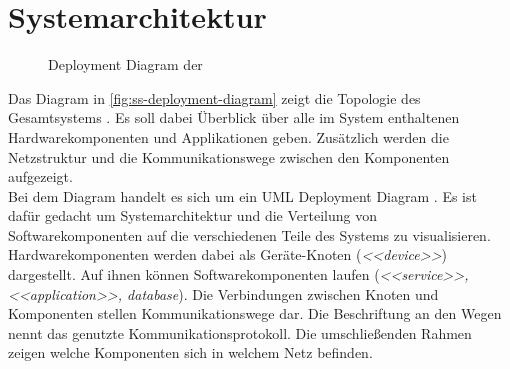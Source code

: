\chapter{Systemarchitektur}
\label{chap:systemarchitektur}

\begin{figure}
    \centering
    
    \caption{Deployment Diagram der \shst{}}
    \label{fig:ss-deployment-diagram}
\end{figure}

Das Diagram in \autoref{fig:ss-deployment-diagram} zeigt die Topologie des Gesamtsystems \shst{}.
Es soll dabei Überblick über alle im System enthaltenen Hardwarekomponenten und Applikationen
geben. Zusätzlich werden die Netzstruktur und die Kommunikationswege zwischen den Komponenten 
aufgezeigt.\\
Bei dem Diagram handelt es sich um ein UML Deployment Diagram \cite{uml-diagrams}. Es ist dafür 
gedacht um Systemarchitektur und die Verteilung von Softwarekomponenten auf die verschiedenen
Teile des Systems zu visualisieren. Hardwarekomponenten werden dabei als Geräte-Knoten
(\emph{<<device>>}) dargestellt. Auf ihnen können Softwarekomponenten laufen (\emph{<<service>>,
<<application>>, database}). Die Verbindungen zwischen Knoten und Komponenten stellen
Kommunikationswege dar. Die Beschriftung an den Wegen nennt das genutzte Kommunikationsprotokoll. 
Die umschließenden Rahmen zeigen welche Komponenten sich in welchem Netz befinden.  

\iffalse
Soll Überblick über das System sharing-station geben
Topologie des Systems
Ein Deployment-Diagram nach UML gibt einen Überblick über das Gesamtsystem
\fi